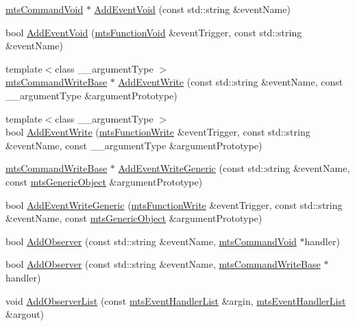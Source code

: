 {\bf }\par
\begin{DoxyCompactItemize}
\item 
\hyperlink{classmts_command_void}{mts\+Command\+Void} $\ast$ \hyperlink{classmts_interface_provided_a2277f5eca61d7f8ee3fb7dfc92fc44cd}{Add\+Event\+Void} (const std\+::string \&event\+Name)
\item 
bool \hyperlink{classmts_interface_provided_a2fa41be4c5193ef23103d040e2654c5b}{Add\+Event\+Void} (\hyperlink{classmts_function_void}{mts\+Function\+Void} \&event\+Trigger, const std\+::string \&event\+Name)
\item 
{\footnotesize template$<$class \+\_\+\+\_\+argument\+Type $>$ }\\\hyperlink{classmts_command_write_base}{mts\+Command\+Write\+Base} $\ast$ \hyperlink{classmts_interface_provided_a700ebfb28c1ef1b28a7a77c6198949e0}{Add\+Event\+Write} (const std\+::string \&event\+Name, const \+\_\+\+\_\+argument\+Type \&argument\+Prototype)
\item 
{\footnotesize template$<$class \+\_\+\+\_\+argument\+Type $>$ }\\bool \hyperlink{classmts_interface_provided_aa2dc4c89808debdd6c221ab36bac1979}{Add\+Event\+Write} (\hyperlink{classmts_function_write}{mts\+Function\+Write} \&event\+Trigger, const std\+::string \&event\+Name, const \+\_\+\+\_\+argument\+Type \&argument\+Prototype)
\item 
\hyperlink{classmts_command_write_base}{mts\+Command\+Write\+Base} $\ast$ \hyperlink{classmts_interface_provided_a20122111344850b258e41cafac774935}{Add\+Event\+Write\+Generic} (const std\+::string \&event\+Name, const \hyperlink{classmts_generic_object}{mts\+Generic\+Object} \&argument\+Prototype)
\item 
bool \hyperlink{classmts_interface_provided_ad1beb04b02968dd9cb740d913500a279}{Add\+Event\+Write\+Generic} (\hyperlink{classmts_function_write}{mts\+Function\+Write} \&event\+Trigger, const std\+::string \&event\+Name, const \hyperlink{classmts_generic_object}{mts\+Generic\+Object} \&argument\+Prototype)
\end{DoxyCompactItemize}

{\bf }\par
\begin{DoxyCompactItemize}
\item 
bool \hyperlink{classmts_interface_provided_a10cb738a0133cbbd47c13b7197533f27}{Add\+Observer} (const std\+::string \&event\+Name, \hyperlink{classmts_command_void}{mts\+Command\+Void} $\ast$handler)
\item 
bool \hyperlink{classmts_interface_provided_a8586c5e2f8394ae1e552199ed99ece54}{Add\+Observer} (const std\+::string \&event\+Name, \hyperlink{classmts_command_write_base}{mts\+Command\+Write\+Base} $\ast$handler)
\item 
void \hyperlink{classmts_interface_provided_a288043c859ac6c95b7042c7096e1e232}{Add\+Observer\+List} (const \hyperlink{classmts_event_handler_list}{mts\+Event\+Handler\+List} \&argin, \hyperlink{classmts_event_handler_list}{mts\+Event\+Handler\+List} \&argout)
\end{DoxyCompactItemize}


